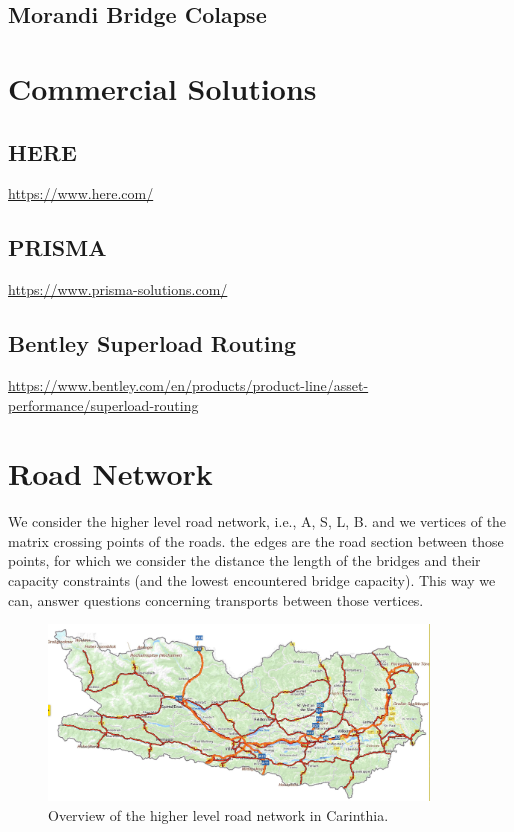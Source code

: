 \cite{wankmuller2020coordination}

\subsection{Morandi Bridge Colapse}

\cite{Morgese.2020}
\cite{MorandiNYTimes}
\cite{scharfetter2001assessing}

\section{Commercial Solutions}

\subsection{HERE}
\url{https://www.here.com/}
\subsection{PRISMA}
\url{https://www.prisma-solutions.com/}

\subsection{Bentley Superload Routing}
\url{https://www.bentley.com/en/products/product-line/asset-performance/superload-routing}



\section{Road Network}

We consider the higher level road network, i.e., A, S, L, B.
and we vertices of the matrix crossing points of the roads.
the edges are the road section between those points, for which we
consider the distance the length of the bridges and their capacity constraints (and the lowest encountered bridge capacity).
This way we can, answer questions concerning transports between those vertices.

\begin{figure}
 \centering
  \includegraphics[width=0.9\textwidth]{map.jpg}
  \caption{Overview of the higher level road network in Carinthia.}
  \label{fig:higher level}
\end{figure}

